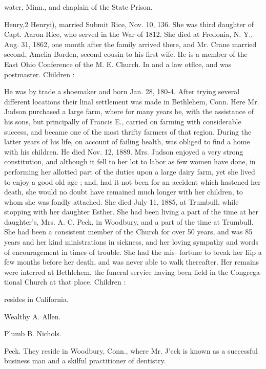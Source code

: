 \documentclass[oneside]{book}
\begin{document}
water, Minn., and chaplain of the State Prison. 

Henry,2 Henryi), married Submit Rice, Nov. 10, 136. She 
was third daughter of Capt. Aaron Rice, who served in the War 
of 1812. She died at Fredonia, N. Y., Aug. 31, 1862, one 
month after the family arrived there, and Mr. Crane married 
second, Amelia Borden, second cousin to his first wife. He is a 
member of the East Ohio Conference of the M. E. Church. In 
and a law otflce, and was postmaster. Cliildren : 




He was by trade a shoemaker and born Jan. 28, 180-4. After 
trying several different locations their linal settlement was made 
in Bethlehem, Conn. Here Mr. Judson purchased a large farm, 
where for many years he, with the assistance of his sons, but 
principally of Francis E., carried on farming with considerable 
success, and became one of the most thrifty farmers of that 
region. During the latter years of his life, on account of failing 
health, was obliged to find a home with his children. He died 
Nov. 12, 1889. Mrs. Judson enjoyed a very strong constitution, 
and although it fell to her lot to labor as few women have done, 
in performing her allotted part of the duties upon a large dairy 
farm, yet she lived to enjoy a good old age ; and, had it not been 
for an accident which hastened her death, she would no doubt 
have remained much longer with her children, to whom she was 
fondly attached. She died July 11, 1885, at Trumbull, while 
stopping with her daughter Esther. She had been living a part 
of the time at her daughter's, Mrs. A. C. Peck, in Woodbury, 
and a part of the time at Trumbull. She had been a consistent 
member of the Church for over 50 years, and was 85 years and 
her kind ministrations in sickness, and her loving sympathy and 
words of encouragement in times of trouble. She had the mis- 
fortune to break her Iiip a few months before her death, and was 
never able to walk thereafter. Her remains were interred at 
Bethlehem, the funeral service having been lield in the Congrega- 
tional Church at that place. Children : 




resides in California. 


Wealthy A. Allen. 




Plumb B. Nichols. 


Peck. They reside in Woodbury, Conn., where Mr. J'cck is 
known as a successful business man and a skilful practitioner 
of dentistry. 
\end{document}
